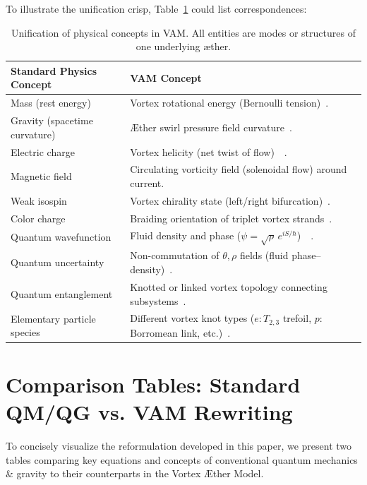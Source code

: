 \documentclass[preprint]{revtex4-2}
\begin{document}
    To illustrate the unification crisp, Table~\ref{tab:unification} could list correspondences:
    \begin{table}[H]
        \centering
        \scriptsize
        \begin{tabular}{p{} p{}}
            \hline
            Standard Physics Concept & VAM Concept \\
            \hline
            Mass (rest energy) & Vortex rotational energy (Bernoulli tension)~\cite{reference_168}. \\
            Gravity (spacetime curvature) & Æther swirl pressure field curvature~\cite{reference_169}. \\
            Electric charge & Vortex helicity (net twist of flow)~\cite{reference_170}~\cite{reference_171}. \\
            Magnetic field & Circulating vorticity field (solenoidal flow) around current. \\
            Weak isospin & Vortex chirality state (left/right bifurcation)~\cite{reference_172}. \\
            Color charge & Braiding orientation of triplet vortex strands~\cite{reference_173}. \\
            Quantum wavefunction & Fluid density and phase ($\psi = \sqrt{\rho}\,e^{iS/\hbar}$)~\cite{reference_174}~\cite{reference_175}. \\
            Quantum uncertainty & Non-commutation of $\theta,\rho$ fields (fluid phase–density)~\cite{reference_176}. \\
            Quantum entanglement & Knotted or linked vortex topology connecting subsystems~\cite{reference_177}. \\
            Elementary particle species & Different vortex knot types ($e: T_{2,3}$ trefoil, $p$: Borromean link, etc.)~\cite{reference_178}. \\
            \hline
        \end{tabular}
        \caption{Unification of physical concepts in VAM. All entities are modes or structures of one underlying æther.}
        \label{tab:unification}
    \end{table}

\section{Comparison Tables: Standard QM/QG vs. VAM Rewriting}
    To concisely visualize the reformulation developed in this paper, we present two tables comparing key equations and concepts of conventional quantum mechanics \& gravity to their counterparts in the Vortex Æther Model.
\end{document}
